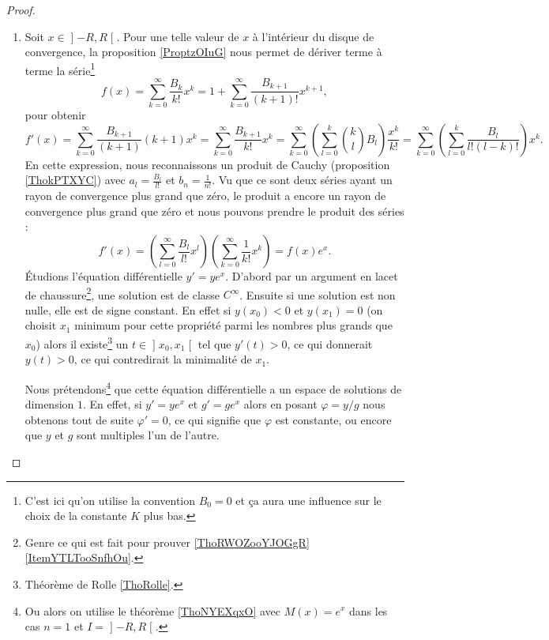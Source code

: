 \begin{proof}
\begin{enumerate}
        \item

            Soit \( x\in\mathopen] -R , R \mathclose[\). Pour une telle valeur de \( x\) à l'intérieur du disque de convergence, la proposition \ref{ProptzOIuG} nous permet de dériver terme à terme la série\footnote{C'est ici qu'on utilise la convention \( B_0=0\) et ça aura une influence sur le choix de la constante \( K\) plus bas.}
                \begin{equation}
                    f(x)=\sum_{k=0}^{\infty}\frac{ B_k }{ k! }x^k=1+\sum_{k=0}^{\infty}\frac{ B_{k+1} }{ (k+1)! }x^{k+1},
                \end{equation}
                pour obtenir
                \begin{equation}
                    f'(x)=\sum_{k=0}^{\infty}\frac{ B_{k+1} }{ (k+1) }(k+1)x^k=\sum_{k=0}^{\infty}\frac{ B_{k+1} }{ k! }x^k=\sum_{k=0}^{\infty}\left( \sum_{l=0}^k{k\choose l}B_l \right)\frac{ x^k }{ k! }=\sum_{k=0}^{\infty}\left( \sum_{l=0}^k\frac{ B_l }{ l!(l-k)! } \right)x^k.
                \end{equation}
                En cette expression, nous reconnaissons un produit de Cauchy (proposition \ref{ThokPTXYC}) avec \( a_l=\frac{ B_l }{ l! }\) et \( b_n=\frac{ 1 }{ n! }\). Vu que ce sont deux séries ayant un rayon de convergence plus grand que zéro, le produit a encore un rayon de convergence plus grand que zéro et nous pouvons prendre le produit des séries :
                \begin{equation}
                    f'(x)=\left( \sum_{l=0}^{\infty}\frac{ B_l }{ l! }x^l \right)\left( \sum_{k=0}^{\infty}\frac{1}{ k! }x^k \right)=f(x) e^{x}.
                \end{equation}
            Étudions l'équation différentielle \( y'=ye^x\). D'abord par un argument en lacet de chaussure\footnote{Genre ce qui est fait pour prouver \ref{ThoRWOZooYJOGgR}\ref{ItemYTLTooSnfhOu}.}, une solution est de classe \(  C^{\infty}\). Ensuite si une solution est non nulle, elle est de signe constant. En effet si \( y(x_0)<0\) et \( y(x_1)=0\) (on choisit \( x_1\) minimum pour cette propriété parmi les nombres plus grands que \( x_0\)) alors il existe\footnote{Théorème de Rolle \ref{ThoRolle}.} un \( t\in\mathopen] x_0 , x_1 \mathclose[\) tel que \( y'(t)>0\), ce qui donnerait \( y(t)>0\), ce qui contredirait la minimalité de \( x_1\).

                Nous prétendons\footnote{Ou alors on utilise le théorème \ref{ThoNYEXqxO} avec \( M(x)=e^x\) dans les cas \( n=1\) et \( I=\mathopen] -R , R \mathclose[\).} que cette équation différentielle a un espace de solutions de dimension \( 1\). En effet, si \( y'=ye^x\) et \( g'=ge^x\) alors en posant \( \varphi=y/g\) nous obtenons tout de suite \( \varphi'=0\), ce qui signifie que \( \varphi\) est constante, ou encore que \( y\) et \( g\) sont multiples l'un de l'autre.


\end{enumerate}
\end{proof}
